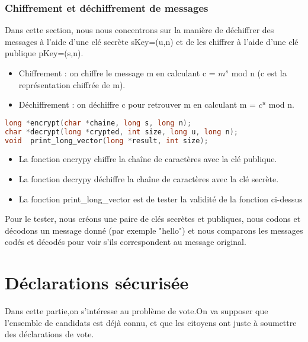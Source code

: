 \documentclass{article}
\begin{document}
\subsubsection{Chiffrement et déchiffrement de messages}
Dans cette section, nous nous concentrons sur la manière de déchiffrer des messages à l'aide d'une clé secrète sKey=(u,n)  et de les chiffrer à l'aide d'une clé publique pKey=(s,n).
\begin{itemize}
\item Chiffrement : on chiffre le message m en calculant c = $m^s$ mod n (c est la représentation
chiffrée de m).
\item Déchiffrement : on déchiffre c pour retrouver m en calculant m = $c^u$ mod n.
\end{itemize}
\begin{lstlisting}[language={C}]
long *encrypt(char *chaine, long s, long n);
char *decrypt(long *crypted, int size, long u, long n);
void  print_long_vector(long *result, int size);
\end{lstlisting}
\begin{itemize}
\item La fonction encrypy chiffre la chaîne de caractères avec la clé publique.
\item La fonction decrypy déchiffre la chaîne de caractères avec la clé secrète.
\item La fonction print\_long\_vector est de tester la validité de la fonction ci-dessus
\end{itemize}

Pour le tester, nous créons une paire de clés secrètes et publiques, nous codons et décodons un message donné (par exemple "hello") et nous comparons les messages codés et décodés pour voir s'ils correspondent au message original.
\section{Déclarations sécurisée}
Dans cette partie,on s'intéresse au problème de vote.On va supposer que l'ensemble de candidats est déjà connu, et que les citoyens ont juste à soumettre des déclarations de vote.\newline
{}
\end{document}
